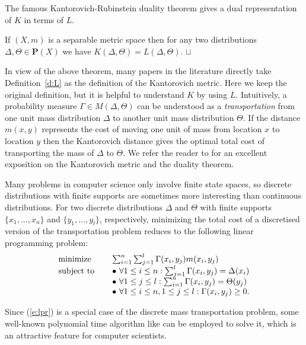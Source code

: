 \documentclass{article}
\def \BP{\textbf{P}}
\def\squareforqed{\hbox{\rlap{$\sqcap$}$\sqcup$}}
\def\qed{\ifmmode\squareforqed\else{\unskip\nobreak\hfil
\penalty50\hskip1em\null\nobreak\hfil\squareforqed
\parfillskip=0pt\finalhyphendemerits=0\endgraf}\fi}
\begin{document}
The famous Kantorovich-Rubinstein duality theorem gives a dual
representation of $K$ in terms of  $L$.
\begin{theorem}
\label{t:KRduality} If $(X,m)$
is a separable metric space then for any two distributions
$\Delta,\Theta\in\BP(X)$ we have
$K(\Delta,\Theta)=L(\Delta,\Theta)$. \hfill\qed
\end{theorem}

In view of the above theorem, many papers in the literature directly
take Definition~\ref{d:L} as the definition of the Kantorovich
metric. Here we keep the original definition, but it is helpful to
understand $K$ by using $L$. Intuitively, a probability measure
$\Gamma\in M(\Delta,\Theta)$ can be understood as a
\emph{transportation} from one unit mass distribution $\Delta$ to
another unit mass distribution $\Theta$. If the distance $m(x,y)$
represents the cost of moving one unit of mass from location $x$ to
location $y$ then the Kantorovich distance gives the optimal total
cost of transporting the mass of $\Delta$ to $\Theta$. We refer the
reader to \cite{Vil03} for an excellent exposition on the
Kantorovich metric and the duality theorem.

Many problems in computer science only involve finite state spaces,
so discrete distributions with finite supports are sometimes more
interesting than continuous distributions. For two discrete
distributions $\Delta$ and $\Theta$ with finite supports
$\{x_1,...,x_n\}$ and $\{y_1,...,y_l\}$, respectively, minimizing
the total cost of a discretised version of the transportation
problem reduces to the following linear programming problem:
\begin{equation}\label{e:lpr}
\begin{array}{ll}
\mbox{minimize} & \sum_{i=1}^n \sum_{j=1}^l \Gamma(x_i,y_j)m(x_i,y_j)\\
\mbox{subject to}\hspace{4mm} &     \bullet\  \forall 1\leq i\leq n: \sum_{j=1}^l \Gamma(x_i,y_j)=\Delta(x_i)\\
 &     \bullet\  \forall 1\leq j\leq l: \sum_{i=1}^n \Gamma(x_i,y_j)=\Theta(y_j)\\
 &     \bullet\  \forall 1\leq i\leq n,1\leq j\leq l: \Gamma(x_i,y_j)\geq 0.
\end{array}
\end{equation}

Since (\ref{e:lpr}) is a special case of the discrete mass
transportation problem, some well-known polynomial time algorithm
like \cite{Orl88} can be employed to solve it, which is an
attractive feature for computer scientists.
\end{document}

